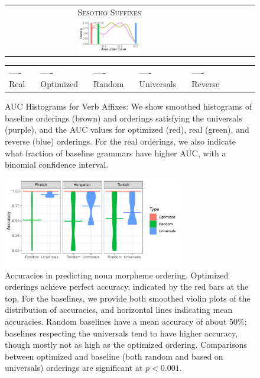 \documentclass[11pt,letterpaper]{article}
\begin{document}
\begin{figure}
\begin{center}
\begin{tabular}{cccccc}
            \\
            \textsc{Sesotho Suffixes} \\
            \includegraphics[width=0.3\textwidth]{figures/sesotho_suffixes/suffixes-byMorphemes-auc-hist-heldout-Coarse-FineSurprisal-optimized.pdf}
    \end{tabular}

    \begin{tabular}{llllllll}
\textbf{\textcolor{real}{----}} Real&
\textbf{\textcolor{optimized}{----}} Optimized&
\textbf{\textcolor{random}{----}} Random&
\textbf{\textcolor{universals}{----}} Universals&
\textbf{\textcolor{reverse}{----}} Reverse
\end{tabular}
    \end{center}
    \caption{AUC Histograms for Verb Affixes: We show smoothed histograms of baseline orderings (brown) and orderings satisfying the universals (purple), and the AUC values for optimized (red), real (green), and reverse (blue) orderings. For the real orderings, we also indicate what fraction of baseline grammars have higher AUC, with a binomial confidence interval.}
    \label{fig:auc_verbs}
\end{figure}


\begin{figure}[]
    \centering
\includegraphics[width=0.7\textwidth]{figures/accuracies_nouns.pdf}
    \caption{Accuracies in predicting noun morpheme ordering.
    Optimized orderings achieve perfect accuracy, indicated by the red bars at the top.
    For the baselines, we provide both smoothed violin plots of the distribution of accuracies, and horizontal lines indicating mean accuracies.
    Random baselines have a mean accuracy of about 50\%; baselines respecting the universals tend to have higher accuracy, though mostly not as high as the optimized ordering.
    Comparisons between optimized and baseline (both random and based on universals) orderings are significant at $p<0.001$.}
    \label{tab:optimized_acc_nouns}
\end{figure}
\end{document}
